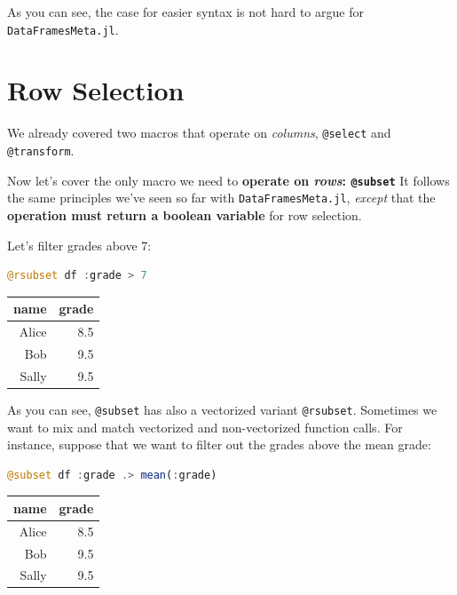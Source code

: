 \documentclass[
  notoc %
]{tufte-book}
\newcommand{\passthrough}[1]{#1}
\begin{document}
As you can see, the case for easier syntax is not hard to argue for
\passthrough{\lstinline!DataFramesMeta.jl!}.

\hypertarget{sec:dataframesmeta_subset}{%
\section{Row Selection}\label{sec:dataframesmeta_subset}}

We already covered two macros that operate on \emph{columns},
\passthrough{\lstinline!@select!} and
\passthrough{\lstinline!@transform!}.

Now let's cover the only macro we need to \textbf{operate on
\emph{rows}: \passthrough{\lstinline!@subset!}} It follows the same
principles we've seen so far with
\passthrough{\lstinline!DataFramesMeta.jl!}, \emph{except} that the
\textbf{operation must return a boolean variable} for row selection.

Let's filter grades above 7:

\begin{lstlisting}[language=Julia]
@rsubset df :grade > 7
\end{lstlisting}

\begin{longtable}[]{@{}rr@{}}
\toprule()
name & grade \\
\midrule()
\endhead
Alice & 8.5 \\
Bob & 9.5 \\
Sally & 9.5 \\
\bottomrule()
\end{longtable}

As you can see, \passthrough{\lstinline!@subset!} has also a vectorized
variant \passthrough{\lstinline!@rsubset!}. Sometimes we want to mix and
match vectorized and non-vectorized function calls. For instance,
suppose that we want to filter out the grades above the mean grade:

\begin{lstlisting}[language=Julia]
@subset df :grade .> mean(:grade)
\end{lstlisting}

\begin{longtable}[]{@{}rr@{}}
\toprule()
name & grade \\
\midrule()
\endhead
Alice & 8.5 \\
Bob & 9.5 \\
Sally & 9.5 \\
\bottomrule()
\end{longtable}
\end{document}
